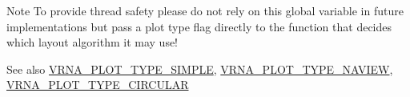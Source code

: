 \begin{DoxyNote}{Note}
To provide thread safety please do not rely on this global variable in future implementations but pass a plot type flag directly to the function that decides which layout algorithm it may use!
\end{DoxyNote}
\begin{DoxySeeAlso}{See also}
\mbox{\hyperlink{group__plot__layout__utils_gae6d17b9f0a53cf5205a9181e0f8422e9}{V\+R\+N\+A\+\_\+\+P\+L\+O\+T\+\_\+\+T\+Y\+P\+E\+\_\+\+S\+I\+M\+P\+LE}}, \mbox{\hyperlink{group__plot__layout__utils_ga94d4c863ecac2f220f76658afb92f964}{V\+R\+N\+A\+\_\+\+P\+L\+O\+T\+\_\+\+T\+Y\+P\+E\+\_\+\+N\+A\+V\+I\+EW}}, \mbox{\hyperlink{group__plot__layout__utils_ga8c9eac631348da92136c8363ecdd9fb9}{V\+R\+N\+A\+\_\+\+P\+L\+O\+T\+\_\+\+T\+Y\+P\+E\+\_\+\+C\+I\+R\+C\+U\+L\+AR}} 
\end{DoxySeeAlso}
